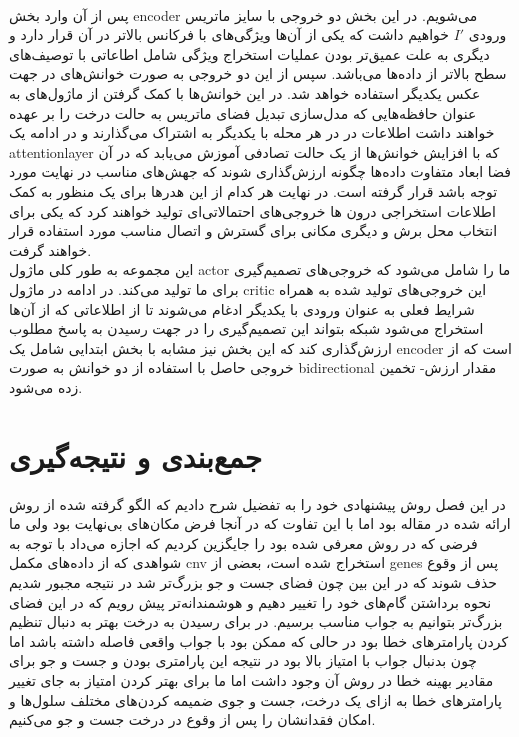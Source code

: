 \\
پس از آن وارد بخش \gls{encoder} می‌شویم. در این بخش دو خروجی با سایز ماتریس ورودی $I'$ خواهیم داشت که یکی از آن‌ها ویژگی‌های با فرکانس بالاتر در آن قرار دارد و دیگری به علت عمیق‌تر بودن عملیات استخراج ویژگی شامل اطاعاتی با توصیف‌های سطح بالاتر از داده‌ها می‌باشد. سپس از این دو خروجی به صورت خوانش‌های در جهت عکس یکدیگر استفاده خواهد شد. در این خوانش‌ها با کمک گرفتن از ماژول‌های  به عنوان حافظه‌هایی که مدل‌سازی تبدیل فضای ماتریس به حالت درخت را بر عهده خواهند داشت اطلاعات در در هر محله با یکدیگر به اشتراک می‌گذارند و در ادامه یک \gls{attentionlayer} که با افزایش خوانش‌ها از یک حالت تصادفی آموزش می‌یابد که در آن فضا ابعاد متفاوت داده‌ها چگونه ارزش‌گذاری شوند که جهش‌‌های مناسب در نهایت مورد توجه باشد قرار گرفته است. در نهایت هر کدام از این هدرها برای یک منظور به کمک اطلاعات استخراجی درون ها خروجی‌های احتمالاتی‌ای تولید خواهند کرد که یکی برای انتخاب محل برش و دیگری مکانی برای گسترش و اتصال مناسب مورد استفاده قرار خواهند گرفت.
\\
این مجموعه به طور کلی ماژول \gls{actor} ما را شامل می‌شود که خروجی‌های تصمیم‌گیری برای ما تولید می‌کند. در ادامه در ماژول \gls{critic} این خروجی‌های تولید شده به همراه شرایط فعلی به عنوان ورودی با یکدیگر ادغام می‌شوند تا از اطلاعاتی که از آن‌ها استخراج می‌شود شبکه بتواند این تصمیم‌گیری را در جهت رسیدن به پاسخ مطلوب ارزش‌گذاری کند که این بخش نیز مشابه با بخش ابتدایی شامل یک \gls{encoder} است که از خروجی حاصل با استفاده از دو خوانش به صورت \gls{bidirectional} مقدار ارزش- تخمین زده می‌شود.


\section{جمع‌بندی و نتیجه‌گیری}
در این فصل روش پیشنهادی خود را به تفضیل شرح دادیم که الگو گرفته شده از روش ارائه شده در مقاله  بود اما با این تفاوت که در آنجا فرض مکان‌های بی‌نهایت بود ولی ما فرضی که در روش  معرفی شده بود را جایگزین کردیم که اجازه می‌داد با توجه به شواهدی که از داده‌های مکمل \gls{cnv} استخراج شده است، بعضی از \glspl{gene} پس از وقوع حذف شوند که در این بین چون فضای جست و جو بزرگ‌تر شد در نتیجه مجبور شدیم نحوه برداشتن گام‌های خود را تغییر دهیم و هوشمندانه‌تر پیش رویم که در این فضای بزرگ‌تر بتوانیم به جواب مناسب برسیم. در  برای رسیدن به درخت بهتر به دنبال تنظیم کردن پارامترهای خطا بود در حالی که ممکن بود با جواب واقعی فاصله داشته باشد اما چون بدنبال جواب با امتیاز بالا بود در نتیجه این پارامتری بودن و جست و جو برای مقادیر بهینه خطا در روش آن وجود داشت اما ما برای بهتر کردن امتیاز به جای تغییر پارامترهای خطا به ازای یک درخت، جست و جوی ضمیمه کردن‌های مختلف سلول‌ها و امکان فقدانشان را پس از وقوع در درخت جست و جو می‌کنیم.








